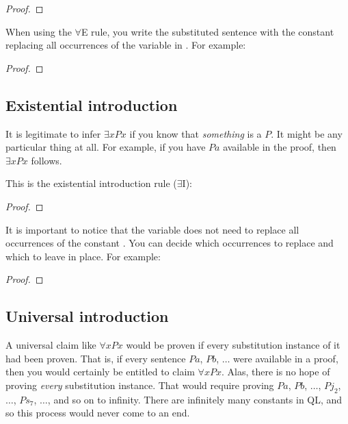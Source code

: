 \begin{proof}
	 
\end{proof}

When using the $\forall$E rule, you write the substituted sentence with the constant  replacing all occurrences of the variable  in . For example:

\begin{proof}
	 
	 
\end{proof}


\subsection{Existential introduction}

It is legitimate to infer $\exists x Px$ if you know that \emph{something} is a $P$. It might be any particular thing at all. For example, if you have $Pa$ available in the proof, then $\exists x Px$ follows. 



This is the existential introduction rule ($\exists$I):

\begin{proof}
	 
\end{proof}

It is important to notice that the variable  does not need to replace all occurrences of the constant . You can decide which occurrences to replace and which to leave in place. For example:
\nopagebreak
\begin{proof}
	 
	 
	 
	 
	 
\end{proof}


\subsection{Universal introduction}
A universal claim like $\forall x Px$ would be proven if {every} substitution instance of it had been proven. That is, if every sentence $Pa$, $Pb$, $\ldots$ were available in a proof, then you would certainly be entitled to claim $\forall x Px$. Alas, there is no hope of proving \emph{every} substitution instance. That would require proving $Pa$, $Pb$, $\ldots$, $Pj_2$, $\ldots$, $Ps_7$, $\ldots$, and so on to infinity. There are infinitely many constants in QL, and so this process would never come to an end.

